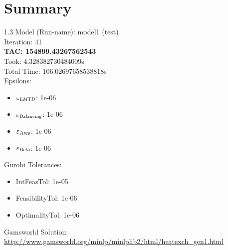 \documentclass{article}%
\begin{document}
%
\normalsize%
\section{Summary}%
\thispagestyle{plain}%
\begin{spacing}{1.3}%
\Large%
Model (Run-name): model1 (test)\\%
Iteration: 41\\%
\textbf{TAC: 154899.43267562543}\\%
Took: 4.328382730484009s\\%
Total Time: 106.02697658538818s\\%
Epsilons:%
\begin{itemize}%
	\item $\varepsilon_{\textsl{LMTD}}$: 1e-06%
	\item $\varepsilon_{\textsl{Balancing}}$: 1e-06%
	\item $\varepsilon_{\textsl{Area}}$: 1e-06%
	\item $\varepsilon_{\textsl{Beta}}$: 1e-06%
\end{itemize}%
Gurobi Tolerances:%
\begin{itemize}%
	\item IntFeasTol: 1e-05%
	\item FeasibilityTol: 1e-06%
	\item OptimalityTol: 1e-06%
\end{itemize}%
\end{spacing}%
\normalsize%
Gamsworld Solution: \url{http://www.gamsworld.org/minlp/minlplib2/html/heatexch_gen1.html}%
%
\clearpage%
\end{document}
